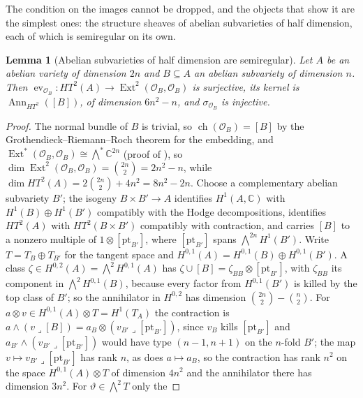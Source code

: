 \documentclass[11pt,reqno]{amsart}
\theoremstyle{plain}
\newtheorem{lemma}[theorem]{Lemma}
\theoremstyle{definition}
\theoremstyle{remark}
\newcommand{\CC}{\mathbb{C}}
\newcommand{\cO}{\mathcal{O}}
\DeclareMathOperator{\ch}{ch}
\DeclareMathOperator{\Ext}{Ext}
\DeclareMathOperator{\Ann}{Ann}
\begin{document}
The condition on the images cannot be dropped, and the objects that show it
are the simplest ones: the structure sheaves of abelian subvarieties of half
dimension, each of which is semiregular on its own.

\begin{lemma}[Abelian subvarieties of half dimension are semiregular]
\label{lem:absemireg}
Let $A$ be an abelian variety of dimension $2n$ and $B\subseteq A$ an abelian
subvariety of dimension $n$. Then $\operatorname{ev}_{\cO_{B}}\colon
HT^{2}(A)\to\Ext^{2}(\cO_{B},\cO_{B})$ is surjective, its kernel is
$\Ann_{HT^{2}}([B])$, of dimension $6n^{2}-n$, and $\sigma_{\cO_{B}}$ is
injective.
\end{lemma}

\begin{proof}
The normal bundle of $B$ is trivial, so $\ch(\cO_{B})=[B]$ by the
Grothendieck--Riemann--Roch theorem for the embedding, and
$\Ext^{*}(\cO_{B},\cO_{B})\cong{\textstyle\bigwedge^{*}}\CC^{2n}$ (proof of
\cite[Corollary~3.17]{paperII}), so $\dim\Ext^{2}(\cO_{B},\cO_{B})=\binom{2n}{2}
=2n^{2}-n$, while $\dim HT^{2}(A)=2\binom{2n}{2}+4n^{2}=8n^{2}-2n$. Choose a
complementary abelian subvariety $B'$; the isogeny $B\times B'\to A$
identifies $H^{1}(A,\CC)$ with $H^{1}(B)\oplus H^{1}(B')$ compatibly with the
Hodge decompositions, identifies $HT^{2}(A)$ with $HT^{2}(B\times B')$
compatibly with contraction, and carries $[B]$ to a nonzero multiple of
$1\otimes[\mathrm{pt}_{B'}]$, where $[\mathrm{pt}_{B'}]$ spans
${\textstyle\bigwedge^{2n}}H^{1}(B')$. Write $T=T_{B}\oplus T_{B'}$ for the
tangent space and $H^{0,1}(A)=H^{0,1}(B)\oplus H^{0,1}(B')$. A class
$\zeta\in H^{0,2}(A)={\textstyle\bigwedge^{2}}H^{0,1}(A)$ has
$\zeta\cup[B]=\zeta_{BB}\otimes[\mathrm{pt}_{B'}]$, with $\zeta_{BB}$ its
component in ${\textstyle\bigwedge^{2}}H^{0,1}(B)$, because every factor from
$H^{0,1}(B')$ is killed by the top class of $B'$; so the annihilator in
$H^{0,2}$ has dimension $\binom{2n}{2}-\binom{n}{2}$. For $a\otimes v\in
H^{0,1}(A)\otimes T=H^{1}(T_{A})$ the contraction is $a\wedge(v\lrcorner[B])
=a_{B}\otimes(v_{B'}\lrcorner[\mathrm{pt}_{B'}])$, since $v_{B}$ kills
$[\mathrm{pt}_{B'}]$ and $a_{B'}\wedge(v_{B'}\lrcorner[\mathrm{pt}_{B'}])$
would have type $(n-1,n+1)$ on the $n$-fold $B'$; the map
$v\mapsto v_{B'}\lrcorner[\mathrm{pt}_{B'}]$ has rank $n$, as does
$a\mapsto a_{B}$, so the contraction has rank $n^{2}$ on the space
$H^{0,1}(A)\otimes T$ of dimension $4n^{2}$ and the annihilator there has
dimension $3n^{2}$. For $\vartheta\in{\textstyle\bigwedge^{2}}T$ only the

\end{proof}
\end{document}
